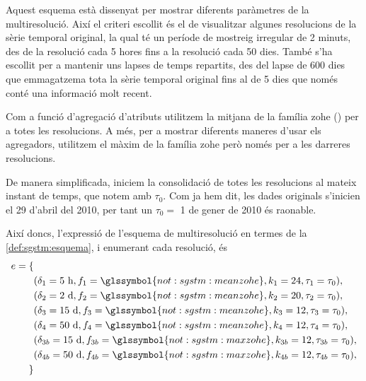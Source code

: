 Aquest esquema està dissenyat per mostrar diferents paràmetres de la
multiresolució. Així el criteri escollit és el de visualitzar algunes
resolucions de la sèrie temporal original, la qual té un període de
mostreig irregular de 2 minuts, des de la resolució cada 5 hores fins
a la resolució cada 50 dies. També s'ha escollit per a mantenir uns
lapses de temps repartits, des del lapse de 600 dies que emmagatzema
tota la sèrie temporal original fins al de 5 dies que només conté una
informació molt recent.


Com a funció d'agregació d'atributs utilitzem la mitjana de la família
\gls{zohe} () per a totes les
resolucions. A més, per a mostrar diferents maneres d'usar els
agregadors, utilitzem el màxim de la família \gls{zohe} però només per
a les darreres resolucions.


De manera simplificada, iniciem la consolidació de totes les
resolucions al mateix instant de temps, que notem amb $\tau_0$. Com ja
hem dit, les dades originals s'inicien el 29 d'abril del 2010, per
tant un $\tau_0=$ 1 de gener de 2010 és raonable.


Així doncs, l'expressió de l'esquema de multiresolució en termes de la \autoref{def:sgstm:esquema}, i enumerant cada resolució,  és
\begin{align*}
e = \{ &\\ 
&(\delta_1=5 \text{ h},f_1=\glssymbol{not:sgstm:meanzohe},k_1=24,\tau_1=\tau_0),\\
&(\delta_2=2 \text{ d},f_2=\glssymbol{not:sgstm:meanzohe},k_2=20,\tau_2=\tau_0),\\
&(\delta_3=15 \text{ d},f_3=\glssymbol{not:sgstm:meanzohe},k_3=12,\tau_3=\tau_0),\\
&(\delta_4=50 \text{ d},f_4=\glssymbol{not:sgstm:meanzohe},k_4=12,\tau_4=\tau_0),\\
&(\delta_{3b}=15 \text{ d},f_{3b}=\glssymbol{not:sgstm:maxzohe},k_{3b}=12,\tau_{3b}=\tau_0),\\
&(\delta_{4b}=50 \text{ d},f_{4b}=\glssymbol{not:sgstm:maxzohe},k_{4b}=12,\tau_{4b}=\tau_0),\\
\}&
\end{align*}


